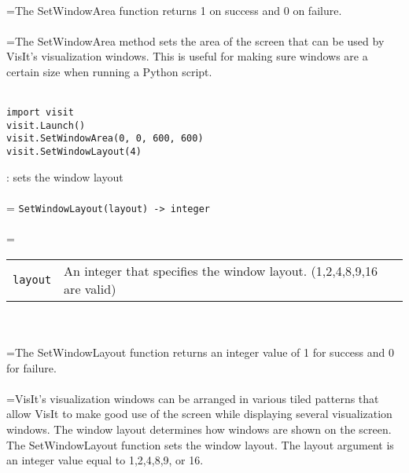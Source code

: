 \documentclass[10pt,a4paper]{report}
\begin{document}
 \\ 
\hangindent=\parindent The SetWindowArea function returns 1 on success and 0 on failure. \\[-3mm] 

 \\ 
\hangindent=\parindent The SetWindowArea method sets the area of the screen that can be used by VisIt's visualization windows. This is useful for making sure windows are a certain size when running a Python script. \\[-3mm] 

\\[-6mm]
\begin{verbatim}import visit
visit.Launch()
visit.SetWindowArea(0, 0, 600, 600)
visit.SetWindowLayout(4)
\end{verbatim}
\newpage


{}
: sets the window layout\\[-3mm]

 \\ 
\hangindent=\parindent 
\verb!SetWindowLayout(layout) -> integer!\\ [-3mm]

 \\ 
\hangindent=\parindent 
\begin{tabular}{lp{9cm}}
\verb!layout! & An integer that specifies the window layout. (1,2,4,8,9,16 are valid) \\
\end{tabular} \\[-2mm]


 \\ 
\hangindent=\parindent The SetWindowLayout function returns an integer value of 1 for success and 0 for failure. \\[-3mm] 

 \\ 
\hangindent=\parindent VisIt's visualization windows can be arranged in various tiled patterns that allow VisIt to make good use of the screen while displaying several visualization windows. The window layout determines how windows are shown on the screen. The SetWindowLayout function sets the window layout. The layout argument is an integer value equal to 1,2,4,8,9, or 16. \\[-3mm] 
\end{document}
